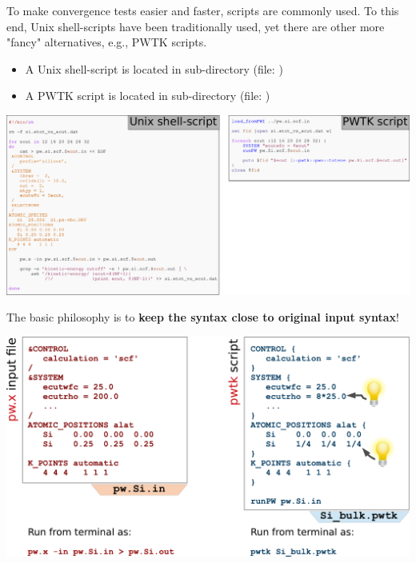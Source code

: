 \documentclass[landscape]{foils}
\begin{document}
%
To make convergence tests easier and faster, scripts are commonly
used. To this end, Unix shell-scripts have been traditionally used,
yet there are other more "fancy" alternatives, e.g., PWTK
scripts.\vspace{-1em}
{\small
  \begin{itemize}
  \item A Unix shell-script is located in
     sub-directory (file: )
  \item A PWTK script is located in  sub-directory
    (file: )
  \end{itemize}  
}
\vspace{0.5cm}
\centerline{\includegraphics[width=1.0\textwidth]{figs/sh-vs-pwtk.pdf}}

\rightfooter{}
The basic philosophy is to {\bf keep the syntax close to original input syntax}!\\[1.5em]
\centerline{\includegraphics[width=1.0\textwidth]{figs/pwtk-syntax.pdf}}
\end{document}
